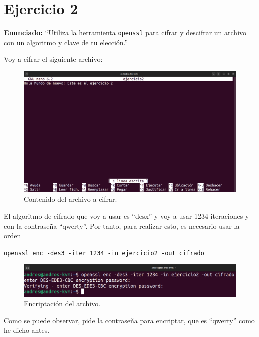 \documentclass{article}
\begin{document}
\section*{Ejercicio 2}

\textbf{Enunciado: }``Utiliza la herramienta \texttt{openssl} para cifrar y descifrar un archivo con un algoritmo y clave de tu elección.''

\bigskip

Voy a cifrar el siguiente archivo:

\begin{figure}[H]
    \includegraphics[width=\textwidth]{imagenes/Captura desde 2022-10-19 17-33-08.png}
    \caption{Contenido del archivo a cifrar.}
\end{figure}

El algoritmo de cifrado que voy a usar es ``desx'' y voy a usar 1234 iteraciones y con la contraseña ``qwerty''. Por tanto, para realizar esto, es necesario usar la orden 

\verb|openssl enc -des3 -iter 1234 -in ejercicio2 -out cifrado|

\begin{figure}[H]
    \includegraphics[width=\textwidth]{imagenes/Captura desde 2022-10-19 17-44-41.png}
    \caption{Encriptación del archivo.}
\end{figure}

Como se puede observar, pide la contraseña para encriptar, que es ``qwerty'' como he dicho antes. 
\end{document}
